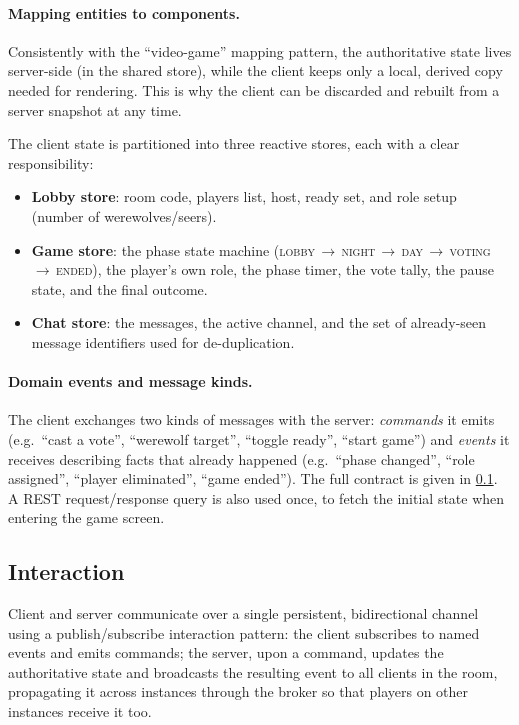 \documentclass{scrartcl}
\begin{document}
\paragraph{Mapping entities to components.} Consistently with the
``video-game'' mapping pattern, the authoritative state lives
server-side (in the shared store), while the client keeps only a local,
derived copy needed for rendering. This is why the client can be
discarded and rebuilt from a server snapshot at any time.

The client state is partitioned into three reactive stores, each with a
clear responsibility:
\begin{itemize}
  \item \textbf{Lobby store}: room code, players list, host, ready set,
  and role setup (number of werewolves/seers).
  \item \textbf{Game store}: the phase state machine
  (\textsc{lobby}\,$\rightarrow$\,\textsc{night}\,$\rightarrow$\,\textsc{day}\,$\rightarrow$\,\textsc{voting}\,$\rightarrow$\,\textsc{ended}),
  the player's own role, the phase timer, the vote tally, the pause
  state, and the final outcome.
  \item \textbf{Chat store}: the messages, the active channel, and the
  set of already-seen message identifiers used for de-duplication.
\end{itemize}

\paragraph{Domain events and message kinds.} The client exchanges two
kinds of messages with the server: \emph{commands} it emits (e.g.\ ``cast
a vote'', ``werewolf target'', ``toggle ready'', ``start game'') and
\emph{events} it receives describing facts that already happened (e.g.\
``phase changed'', ``role assigned'', ``player eliminated'', ``game
ended''). The full contract is given in \cref{interaction}. A REST
request/response query is also used once, to fetch the initial state
when entering the game screen.

\subsection{Interaction}\label{interaction}

Client and server communicate over a single persistent, bidirectional
channel using a publish/subscribe interaction pattern: the client
subscribes to named events and emits commands; the server, upon a
command, updates the authoritative state and broadcasts the resulting
event to all clients in the room, propagating it across instances
through the broker so that players on other instances receive it too.
\end{document}
